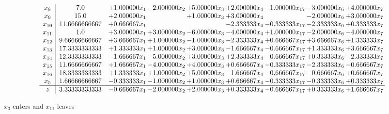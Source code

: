 \documentclass[10pt]{article}
\begin{document}
 \[\begin{array}{c| c c@{\hskip 2pt} c@{\hskip 2pt} c@{\hskip 2pt} c@{\hskip 2pt} c@{\hskip 2pt} c@{\hskip 2pt} c@{\hskip 2pt} }
 x_{8}   &  7.0 & + 1.000000 x_{1} & -2.000000 x_{2} & + 5.000000 x_{3} & + 2.000000 x_{4} & -1.000000 x_{17} & -3.000000 x_{6} & + 4.000000 x_{7}\\
 x_{9}   &  15.0 & + 2.000000 x_{1} &   & + 1.000000 x_{3} & + 3.000000 x_{4} &   & -2.000000 x_{6} & + 3.000000 x_{7}\\
 x_{10}   &  11.6666666667 & + 0.666667 x_{1} &    &   & -2.333333 x_{4} & -0.333333 x_{17} & -2.333333 x_{6} & + 0.333333 x_{7}\\
 x_{11}   &  1.0 & + 3.000000 x_{1} & + 3.000000 x_{2} & -6.000000 x_{3} & -4.000000 x_{4} & + 1.000000 x_{17} & -2.000000 x_{6} & -4.000000 x_{7}\\
 x_{12}   &  9.66666666667 & + 3.666667 x_{1} & + 1.000000 x_{2} & -1.000000 x_{3} & -2.333333 x_{4} & + 0.666667 x_{17} & + 3.666667 x_{6} & + 1.333333 x_{7}\\
 x_{13}   &  17.3333333333 & + 1.333333 x_{1} & + 1.000000 x_{2} & + 3.000000 x_{3} & -1.666667 x_{4} & -0.666667 x_{17} & + 1.333333 x_{6} & + 3.666667 x_{7}\\
 x_{14}   &  12.3333333333 & -1.666667 x_{1} & -5.000000 x_{2} & + 3.000000 x_{3} & + 2.333333 x_{4} & -0.666667 x_{17} & + 0.333333 x_{6} & -2.333333 x_{7}\\
 x_{15}   &  11.6666666667 & + 1.666667 x_{1} & -4.000000 x_{2} & + 4.000000 x_{3} & + 0.666667 x_{4} & -0.333333 x_{17} & -2.333333 x_{6} & -0.666667 x_{7}\\
 x_{16}   &  18.3333333333 & + 1.333333 x_{1} & + 1.000000 x_{2} & + 5.000000 x_{3} & -1.666667 x_{4} & -0.666667 x_{17} & -0.666667 x_{6} & + 0.666667 x_{7}\\
 x_{5}   &  1.66666666667 & -0.333333 x_{1} & -1.000000 x_{2} & + 1.000000 x_{3} & + 0.666667 x_{4} & -0.333333 x_{17} & -0.333333 x_{6} & + 0.333333 x_{7}\\
\hline
z    &  3.33333333333 & -0.666667 x_{1} & -2.000000 x_{2} & + 2.000000 x_{3} & + 0.333333 x_{4} & -0.666667 x_{17} & + 0.333333 x_{6} & + 1.666667 x_{7}\\
\end{array}\]


 $ x_{3} $ enters and $ x_{11} $ leaves 
\end{document}
